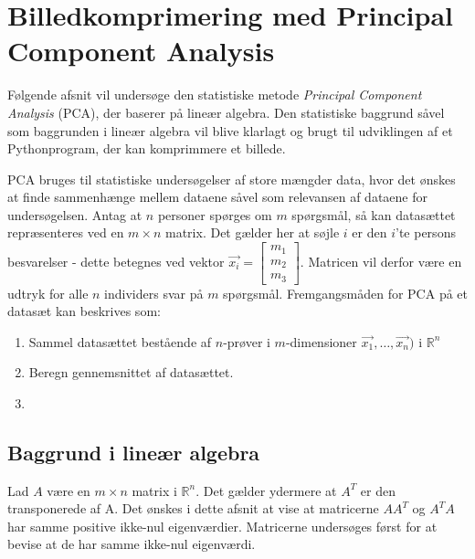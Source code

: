 \chapter{Billedkomprimering med Principal Component Analysis}
Følgende afsnit vil undersøge den statistiske metode \emph{Principal Component Analysis} (PCA), der baserer på lineær algebra. Den statistiske baggrund såvel som baggrunden i lineær algebra vil blive klarlagt og brugt til udviklingen af et Pythonprogram, der kan komprimmere et billede.

PCA bruges til statistiske undersøgelser af store mængder data, hvor det ønskes at finde sammenhænge mellem dataene såvel som relevansen af dataene for undersøgelsen. Antag at $n$ personer spørges om $m$ spørgsmål, så kan datasættet repræsenteres ved en $m \times n$ matrix. Det gælder her at søjle $i$ er den $i$'te persons besvarelser - dette betegnes ved vektor $ \vec{x_i}=\begin{bmatrix} m_{1} \\ m_{2} \\ m_{3} \end{bmatrix} $. Matricen vil derfor være en udtryk for alle $n$ individers svar på $m$ spørgsmål.
Fremgangsmåden for PCA på et datasæt kan beskrives som:
\begin{enumerate}
\item Sammel datasættet bestående af $n$-prøver i $m$-dimensioner $\vec{x_1},…,\vec{x_n})$ i $\mathbb{R}^n$
\item Beregn gennemsnittet af datasættet.
\item
\end{enumerate}


\section{Baggrund i lineær algebra}
Lad $A$ være en $m \times n$ matrix i $\mathbb{R}^n$. Det gælder ydermere at $A^T$ er den transponerede af A.
Det ønskes i dette afsnit at vise at matricerne $AA^T$ og $A^TA$ har samme positive ikke-nul eigenværdier. Matricerne undersøges først for at bevise at de har samme ikke-nul eigenværdi.

